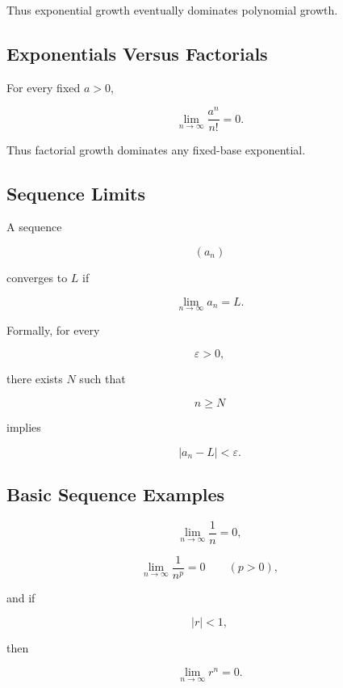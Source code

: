 Thus exponential growth eventually dominates polynomial growth.

\subsection{Exponentials Versus Factorials}
\label{subsec:exponential-versus-factorial}

For every fixed \(a>0\),

\[
\boxed{
\lim_{n\to\infty}
\frac{a^n}{n!}
=
0.
}
\]

Thus factorial growth dominates any fixed-base exponential.

\subsection{Sequence Limits}
\label{subsec:sequence-limits-reference}

A sequence

\[
(a_n)
\]

converges to \(L\) if

\[
\boxed{
\lim_{n\to\infty}a_n=L.
}
\]

Formally, for every

\[
\varepsilon>0,
\]

there exists \(N\) such that

\[
n\geq N
\]

implies

\[
\boxed{
|a_n-L|<\varepsilon.
}
\]

\subsection{Basic Sequence Examples}
\label{subsec:basic-sequence-limit-examples}

\[
\boxed{
\lim_{n\to\infty}
\frac1n
=
0,
}
\]

\[
\boxed{
\lim_{n\to\infty}
\frac1{n^p}
=
0
\qquad
(p>0),
}
\]

and if

\[
|r|<1,
\]

then

\[
\boxed{
\lim_{n\to\infty}
r^n
=
0.
}
\]

